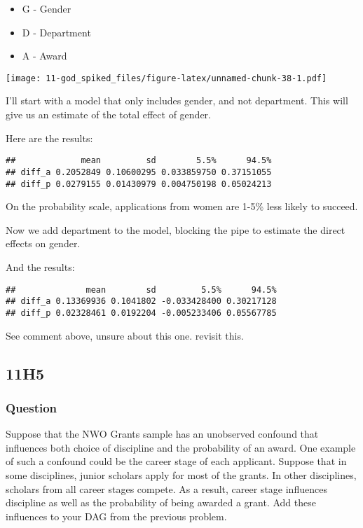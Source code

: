 \documentclass[
]{book}
\providecommand{\tightlist}{%
  \setlength{\itemsep}{0pt}\setlength{\parskip}{0pt}}
\begin{document}
\begin{itemize}
\tightlist
\item
  G - Gender
\item
  D - Department
\item
  A - Award
\end{itemize}

\texttt{[image: 11-god\_spiked\_files/figure-latex/unnamed-chunk-38-1.pdf]}

I'll start with a model that only includes gender, and not department. This will give us an estimate of the total effect of gender.

Here are the results:

\begin{verbatim}
##             mean         sd        5.5%      94.5%
## diff_a 0.2052849 0.10600295 0.033859750 0.37151055
## diff_p 0.0279155 0.01430979 0.004750198 0.05024213
\end{verbatim}

On the probability scale, applications from women are 1-5\% less likely to succeed.

Now we add department to the model, blocking the pipe to estimate the direct effects on gender.

And the results:

\begin{verbatim}
##              mean        sd         5.5%      94.5%
## diff_a 0.13369936 0.1041802 -0.033428400 0.30217128
## diff_p 0.02328461 0.0192204 -0.005233406 0.05567785
\end{verbatim}

See comment above, unsure about this one. revisit this.

\hypertarget{h5-3}{%
\subsection*{11H5}\label{h5-3}}

\hypertarget{question-97}{%
\subsubsection*{Question}\label{question-97}}

Suppose that the NWO Grants sample has an unobserved confound that influences both choice of discipline and the probability of an award. One example of such a confound could be the career stage of each applicant. Suppose that in some disciplines, junior scholars apply for most of the grants. In other disciplines, scholars from all career stages compete. As a result, career stage influences discipline as well as the probability of being awarded a grant. Add these influences to your DAG from the previous problem.
\end{document}
